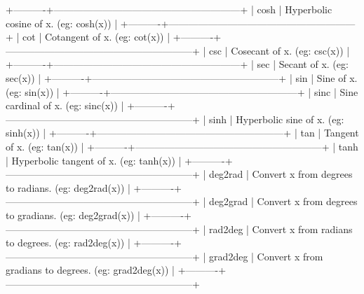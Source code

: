 +----------+---------------------------------------------------------+
| cosh     | Hyperbolic cosine of x.  (eg: cosh(x))                  |
+----------+---------------------------------------------------------+
| cot      | Cotangent of x.  (eg: cot(x))                           |
+----------+---------------------------------------------------------+
| csc      | Cosecant of x.  (eg: csc(x))                            |
+----------+---------------------------------------------------------+
| sec      | Secant of x.  (eg: sec(x))                              |
+----------+---------------------------------------------------------+
| sin      | Sine of x.  (eg: sin(x))                                |
+----------+---------------------------------------------------------+
| sinc     | Sine cardinal of x.  (eg: sinc(x))                      |
+----------+---------------------------------------------------------+
| sinh     | Hyperbolic sine of x.  (eg: sinh(x))                    |
+----------+---------------------------------------------------------+
| tan      | Tangent of x.  (eg: tan(x))                             |
+----------+---------------------------------------------------------+
| tanh     | Hyperbolic tangent of x.  (eg: tanh(x))                 |
+----------+---------------------------------------------------------+
| deg2rad  | Convert x from degrees to radians.  (eg: deg2rad(x))    |
+----------+---------------------------------------------------------+
| deg2grad | Convert x from degrees to gradians.  (eg: deg2grad(x))  |
+----------+---------------------------------------------------------+
| rad2deg  | Convert x from radians to degrees.  (eg: rad2deg(x))    |
+----------+---------------------------------------------------------+
| grad2deg | Convert x from gradians to degrees.  (eg: grad2deg(x))  |
+----------+---------------------------------------------------------+

